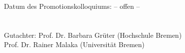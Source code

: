 

\begin{singlespace}
	\vspace*{160mm} Datum des Promotionskolloquiums: -- offen --\\
	\\
	\\
	Gutachter: Prof. Dr. Barbara Grüter (Hochschule Bremen)\\
	Prof. Dr. Rainer Malaka (Universität Bremen)\\
\end{singlespace}
